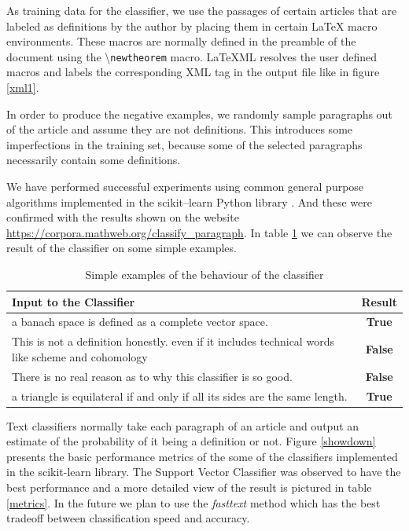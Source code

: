 \documentclass[a4paper]{easychair}
\begin{document}
As training data for the classifier, we use the passages of certain articles that are labeled as definitions by the author by placing them in certain \LaTeX{} macro environments. These macros are normally defined in the preamble of the document using the \textbackslash \texttt{newtheorem} macro. LaTeXML resolves the user defined macros and labels  the corresponding XML tag in the output file like in figure \ref{xml1}. 

In order to produce the negative examples, we randomly sample paragraphs out of the article and assume they are not definitions. This introduces some imperfections in the training set, because some of the selected paragraphs necessarily contain some definitions. 

We have performed successful experiments  using common general purpose algorithms implemented in the scikit--learn Python library \cite{scikit-learn}. And these were confirmed with the results shown on the website \url{https://corpora.mathweb.org/classify_paragraph}.
In table \ref{sanity} we can observe the result of the classifier on some simple examples.

\begin{table}[h]
    \begin{center}
    \begin{tabular}{|p{}|c|}
        \hline
        \hline
        \textbf{Input to the Classifier} & \textbf{Result} \\
        \hline
        \hline
        a banach space is defined as a complete vector space. & \textbf{True}\\
        \hline
        This is not a definition honestly. even if it includes technical words like scheme and cohomology & \textbf{False} \\
        \hline
        There is no real reason as to why this classifier is so good. & \textbf{False}\\
        \hline
        a triangle is equilateral if and only if all its sides are the same length. & \textbf{True}\\
        \hline
    \end{tabular}
    \caption{\label{sanity}Simple examples of the behaviour of the classifier}
    \end{center} 
\end{table}

 Text classifiers normally take each paragraph of an article and output an estimate of the probability of it being a definition or not.  Figure \ref{showdown} presents the basic performance metrics of the some of the classifiers implemented in the scikit-learn library. The Support Vector Classifier was observed to have the best performance and a more detailed view of the result is pictured in table \ref{metrics}. In the future we plan  to use the \textit{fasttext} method \cite{bagof} which has the best tradeoff between classification speed and accuracy.  
\end{document}
